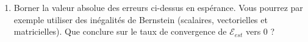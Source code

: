 \documentclass[12pt,a4paper]{article}
\begin{document}
\begin{enumerate}
    \color{blue}

    \color{black}
    \item Borner la valeur absolue des erreurs ci-dessus en espérance.
    Vous pourrez par exemple utiliser des inégalités de Bernstein (scalaires, vectorielles et matricielles).
    Que conclure sur le taux de convergence de $\mathcal{E}_{est}$ vers $0$ ?

    \color{blue}

    \color{black}    
\end{enumerate}
\end{document}
